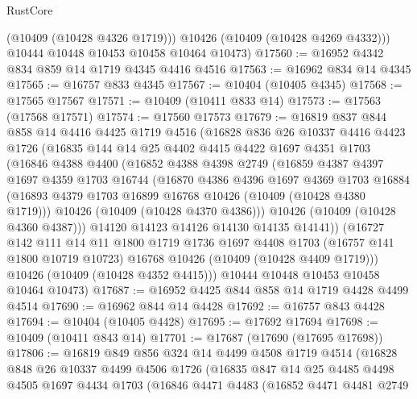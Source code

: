 \begin{lexlean}{RustCore}
\begin{coremodule}
          (@10409 (@10428 @4326 @1719)))
        @10426
        (@10409 (@10428 @4269 @4332)))
      @10444
      @10448
      @10453
      @10458
      @10464
      @10473)
@17560 := @16952 @4342 @834 @859 @14 @1719 @4345 @4416 @4516
@17563 := @16962 @834 @14 @4345
@17565 := @16757 @833 @4345
@17567 := @10404 (@10405 @4345)
@17568 := @17565 @17567
@17571 := @10409 (@10411 @833 @14)
@17573 := @17563 (@17568 @17571)
@17574 := @17560 @17573
@17679 := @16819
    @837
    @844
    @858
    @14
    @4416
    @4425
    @1719
    @4516
    (@16828
      @836
      @26
      @10337
      @4416
      @4423
      @1726
      (@16835
        @144
        @14
        @25
        @4402
        @4415
        @4422
        @1697
        @4351
        @1703
        (@16846
          @4388
          @4400
          (@16852
            @4388
            @4398
            @2749
            (@16859
              @4387
              @4397
              @1697
              @4359
              @1703
              @16744
              (@16870
                @4386
                @4396
                @1697
                @4369
                @1703
                @16884
                (@16893 @4379 @1703 @16899 @16768 @10426 (@10409 (@10428 @4380 @1719)))
                @10426
                (@10409 (@10428 @4370 @4386)))
              @10426
              (@10409 (@10428 @4360 @4387)))
            @14120
            @14123
            @14126
            @14130
            @14135
            @14141))
        (@16727
          @142
          @111
          @14
          @11
          @1800
          @1719
          @1736
          @1697
          @4408
          @1703
          (@16757 @141 @1800 @10719 @10723)
          @16768
          @10426
          (@10409 (@10428 @4409 @1719)))
        @10426
        (@10409 (@10428 @4352 @4415)))
      @10444
      @10448
      @10453
      @10458
      @10464
      @10473)
@17687 := @16952 @4425 @844 @858 @14 @1719 @4428 @4499 @4514
@17690 := @16962 @844 @14 @4428
@17692 := @16757 @843 @4428
@17694 := @10404 (@10405 @4428)
@17695 := @17692 @17694
@17698 := @10409 (@10411 @843 @14)
@17701 := @17687 (@17690 (@17695 @17698))
@17806 := @16819
    @849
    @856
    @324
    @14
    @4499
    @4508
    @1719
    @4514
    (@16828
      @848
      @26
      @10337
      @4499
      @4506
      @1726
      (@16835
        @847
        @14
        @25
        @4485
        @4498
        @4505
        @1697
        @4434
        @1703
        (@16846
          @4471
          @4483
          (@16852
            @4471
            @4481
            @2749

\end{coremodule}
\end{lexlean}
